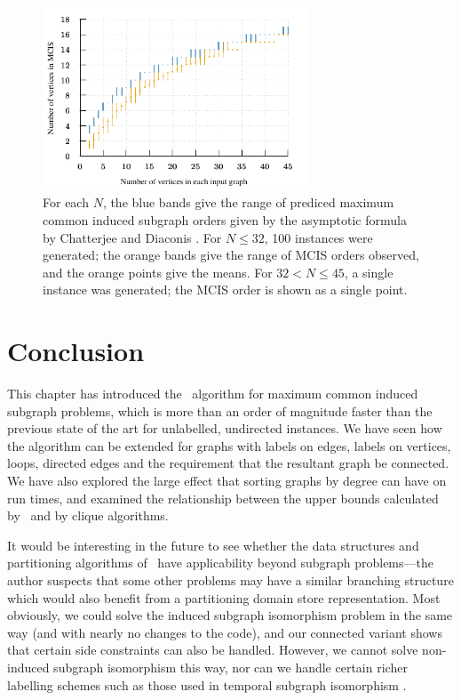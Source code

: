 \begin{figure}[htb]
    \centering
    \includegraphics*[width=0.7\textwidth]{14-mcsplit-i-undirected/data-for-diaconis-and-chatterjee/plot}
    \caption{For each $N$, the blue bands give the range of prediced maximum
    common induced subgraph orders given by the asymptotic formula by
    Chatterjee and Diaconis \cite{chatterjee2021isomorphisms}.  For $N \leq 32$,
    100 instances were generated; the orange bands give the range of MCIS orders
    observed, and the orange points give the means.  For $32 < N \leq 45$,
    a single instance was generated; the MCIS order is shown as a single point.}
    \label{figure:mcis-order-bands}
\end{figure}

\section{Conclusion}
\label{sec:mcsplit-conclusion}

This chapter has introduced the \McSplit\ algorithm for maximum common induced subgraph
problems, which is more than an order of magnitude faster than the
previous state of the art for unlabelled, undirected instances. We have
seen how the algorithm can be extended for graphs with labels on edges, labels
on vertices, loops, directed edges and the requirement that the resultant graph
be connected.  We have also explored the large effect that sorting graphs
by degree can have on run times, and examined the relationship between the upper bounds
calculated by \McSplit\ and by clique algorithms.

It would be interesting in the future to see whether the data structures and
partitioning algorithms of \McSplit\ have applicability beyond subgraph
problems---the author suspects that some other problems may have a similar
branching structure which would also benefit from a partitioning domain store
representation. Most obviously, we could solve the induced subgraph isomorphism
problem in the same way (and with nearly no changes to the code), and our
connected variant shows that certain side constraints can also be handled.
However, we cannot solve non-induced subgraph isomorphism this way, nor can we
handle certain richer labelling schemes such as those used in temporal subgraph
isomorphism \citep{DBLP:conf/asunam/RedmondC13}.

